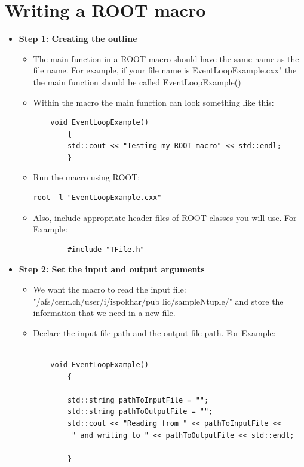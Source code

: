 \documentclass[letterpaper,12pt]{article}
\begin{document}
\section{Writing a ROOT macro}
\begin{itemize}
\item {\bf Step 1: Creating the outline}
\begin{itemize}
	\item The main function in a ROOT macro should have the same name as the file name. For example, if your file name is EventLoopExample.cxx" the the main function should be called EventLoopExample() 

	\item Within the macro the main function can look something like this:
	 \begin{lstlisting}
	void EventLoopExample()
	 	{
	 	std::cout << "Testing my ROOT macro" << std::endl;
	 	}

\end{lstlisting}
	\item Run the macro using ROOT:
\begin{verbatim}
root -l "EventLoopExample.cxx"
	\end{verbatim}
		\item Also, include appropriate header files of ROOT classes you will use. For Example:
		\begin{lstlisting}
		#include "TFile.h"
		\end{lstlisting}
	\end{itemize} 	

	\item {\bf Step 2: Set the input and output arguments}\\
	\begin{itemize}
	
		\item We want the macro to read the input file: "/afs/cern.ch/user/i/ispokhar/pub lic/sampleNtuple/" and store the information that we need in a new file.
		\item Declare the input file path and the output file path. For Example:
			\begin{lstlisting}

	void EventLoopExample()
	 	{
	 	
	 	std::string pathToInputFile = "";
	 	std::string pathToOutputFile = "";
		std::cout << "Reading from " << pathToInputFile <<
		 " and writing to " << pathToOutputFile << std::endl;
	 	
	 	}


\end{lstlisting}
\end{itemize}
\end{itemize}
\end{document}
